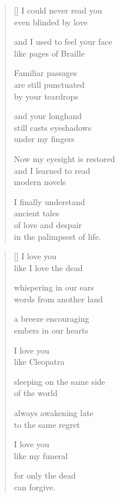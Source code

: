 \documentclass[14pt]{extbook}
\newcommand*{\centeredornament}{\centerline{\pgfornament[width=6cm]{88}}}
\begin{document}
\newpage

\vspace*{-15mm}
\centeredornament
\vspace*{-7mm}


\settowidth{\versewidth}{Now my eyesight is restored}

\begin{verse}[\versewidth]
  I could never read you \\
  even blinded by love

  and I used to feel your face \\
  like pages of Braille

  Familiar passages \\
  are still punctuated \\
  by your teardrops

  and your longhand \\
  still casts eyeshadows \\
  under my fingers

  Now my eyesight is restored \\
  and I learned to read \\
  modern novels

  I finally understand \\
  ancient tales \\
  of love and despair \\
  in the palimpsest of life.
\end{verse}


\newpage

\vspace*{-15mm}
\centeredornament
\vspace*{-7mm}


\settowidth{\versewidth}{sleeping on the same side}

\begin{verse}[\versewidth]
  I love you \\
  like I love the dead

  whispering in our ears \\
  words from another land

  a breeze encouraging \\
  embers in our hearts

  I love you \\
  like Cleopatra

  sleeping on the same side \\
  of the world

  always awakening late \\
  to the same regret

  I love you \\
  like my funeral

  for only the dead \\
  can forgive.
\end{verse}
\end{document}
